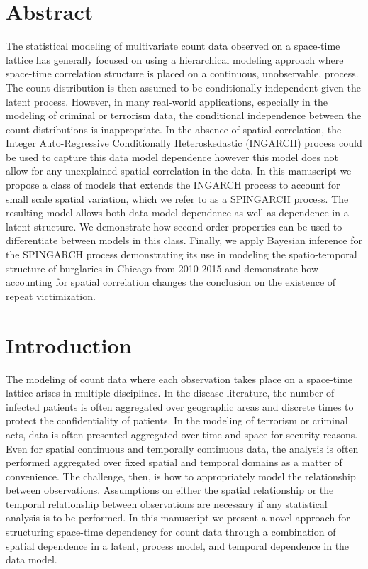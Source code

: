 \documentclass[11pt]{isuthesis}
\begin{document}
\section*{Abstract}
	The statistical modeling of multivariate count data observed on a space-time lattice has generally focused on using a hierarchical modeling approach where space-time correlation structure is placed on a continuous, unobservable, process.  The count distribution is then assumed to be conditionally independent given the latent process.  However, in many real-world applications, especially in the modeling of criminal or terrorism data, the conditional independence between the count distributions is inappropriate.  In the absence of spatial correlation, the Integer Auto-Regressive Conditionally Heteroskedastic (INGARCH) process could be used to capture this data model dependence however this model does not allow for any unexplained spatial correlation in the data. In this manuscript we propose a class of models that extends the INGARCH process to account for small scale spatial variation, which we refer to as a SPINGARCH process. The resulting model allows both data model dependence as well as dependence in a latent structure.  We demonstrate how second-order properties can be used to differentiate between models in this class.  Finally, we apply Bayesian inference for the SPINGARCH process demonstrating its use in modeling the spatio-temporal structure of burglaries in Chicago from 2010-2015 and demonstrate how accounting for spatial correlation changes the conclusion on the existence of repeat victimization.


\section{Introduction} 

The modeling of count data where each observation takes place on a space-time lattice arises in multiple disciplines.  In the disease literature, the number of infected patients is often aggregated over geographic areas and discrete times to protect the confidentiality of patients.  In the modeling of terrorism or criminal acts, data is often presented aggregated over time and space for security reasons.  Even for spatial continuous and temporally continuous data, the analysis is often performed aggregated over fixed spatial and temporal domains as a matter of convenience.  The challenge, then, is how to appropriately model the relationship between observations.  Assumptions on either the spatial relationship or the temporal relationship between observations are necessary if any statistical analysis is to be performed.  In this manuscript we present a novel approach for structuring space-time dependency for count data through a combination of spatial dependence in a latent, process model, and temporal dependence in the data model.
\end{document}
